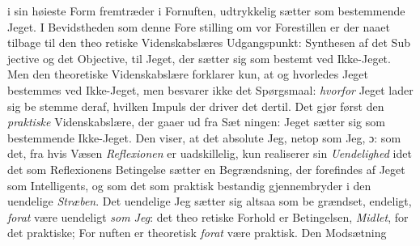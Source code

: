 \documentclass[12pt,a4paper]{book}
\begin{document}
i sin høieste Form fremtræder i Fornuften, udtrykkelig sætter
som bestemmende Jeget. I Bevidstheden som denne Fore\-%
stilling om vor Forestillen er der naaet tilbage til den theo\-%
retiske Videnskabslæres Udgangspunkt: Synthesen af det Sub\-%
jective og det Objective, til Jeget, der sætter sig som bestemt
ved Ikke-Jeget. Men den theoretiske Videnskabslære forklarer
\setcounter{footnote}{0}
kun, at og hvorledes Jeget bestemmes ved Ikke-Jeget, men
besvarer ikke det Spørgsmaal: \emph{hvorfor} Jeget lader sig be\-%
stemme deraf, hvilken Impuls der driver det dertil. Det gjør
først den \emph{praktiske} Videnskabslære, der gaaer ud fra Sæt\-%
ningen: Jeget sætter sig som bestemmende Ikke-Jeget. Den
viser, at det absolute Jeg, netop som Jeg, ɔ: som det, fra
hvis Væsen \emph{Reflexionen} er uadskillelig, kun realiserer sin
\emph{Uendelighed} idet det som Reflexionens Betingelse sætter en
Begrændsning, der forefindes af Jeget som Intelligents, og som
det som praktisk bestandig gjennembryder i den uendelige
\emph{Stræben}. Det uendelige Jeg sætter sig altsaa som be\-%
grændset, endeligt, \emph{forat} være uendeligt \emph{som Jeg}: det theo\-%
retiske Forhold er Betingelsen, \emph{Midlet}, for det praktiske; For\-%
nuften er theoretisk \emph{forat} være praktisk. Den Modsætning
\end{document}
